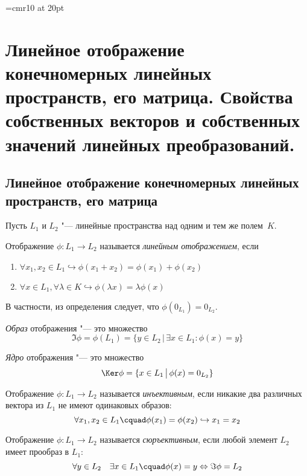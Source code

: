 \font\Large=cmr10 at 20pt
\def\fudge#1{\smash{\hbox{\Large#1}}}
\chapter[Линейное отображение конечномерных линейных прост\-ранств, его матрица. Свойства собственных векторов и собственных значений линейных преобразований.]{Линейное отображение конечномерных линейных пространств, его матрица. Свойства собственных векторов и собственных значений линейных преобразований.}
\section{Линейное отображение конечномерных линейных пространств, его матрица}
Пусть $L_1$ и $L_2$ "--- линейные пространства над одним  и тем же полем~$K$.
\begin{defn}
Отображение $\phi\colon L_1\rightarrow L_2$ называется \textit{линейным отображением}, если
\begin{enumerate}
\item $\forall x_1,x_2 \in L_1 \hookrightarrow \phi(x_1+x_2)=\phi(x_1)+\phi(x_2)$
\item $\forall x \in L_1, \forall \lambda \in K \hookrightarrow \phi(\lambda x)=\lambda \phi(x)$
\end{enumerate}
\end{defn}
В частности, из определения следует, что $\phi(0_{L_1})=0_{L_2}$.
\begin{defn}
\textit{Образ} отображения "--- это множество 
\begin{equation}
\Im\phi=\phi(L_1)=\{y\in L_2\,\big|\, \exists x\in L_1: \phi(x)=y\}
\end{equation}
\end{defn}
\begin{defn}
\textit{Ядро} отображения "--- это множество 
\begin{equation}
\Ker\phi=\{x\in L_1\,\big|\, \phi(x)=0_{L_2}\}
\end{equation}
\end{defn}
\begin{defn}
Отображение $\phi\colon L_1\rightarrow L_2$ называется \textit{инъективным}, если никакие два различных вектора из $L_1$ не имеют одинаковых образов:
\begin{equation}\label{22.1.inject}
\forall x_1,x_2 \in L_1\cquad \phi(x_1)=\phi(x_2) \hookrightarrow x_1=x_2
\end{equation}
\end{defn}  
\begin{defn}
Отображение $\phi\colon L_1\rightarrow L_2$ называется \textit{сюръективным}, если любой элемент $L_2$ имеет прообраз в $L_1$:
\begin{equation}\label{22.1.surject}
\forall y \in L_2 \quad \exists x \in L_1\cquad \phi(x)=y \Leftrightarrow \Im \phi = L_2
\end{equation}
\end{defn}  

